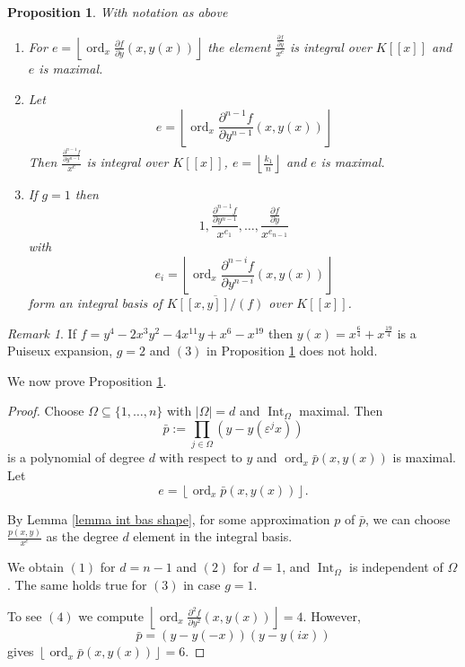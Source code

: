 \documentclass[a4paper,11pt]{amsart}%
\theoremstyle{definition}
\theoremstyle{plain}
\newtheorem{proposition}[defn]{Proposition}
\theoremstyle{remark}
\newtheorem{remark}[defn]{Remark}
\begin{document}
\begin{proposition}
\label{prop integral}
With notation as above
\begin{enumerate}
\item For $e=\left\lfloor \operatorname{ord}_{x}\frac{\partial f}{\partial
y}(x,y(x))\right\rfloor $ the element $\frac{\frac{\partial f}{\partial y}%
}{x^{e}}$ is integral over $K[[x]]$ and $e$ is maximal.

\item Let%
\[
e=\left\lfloor \operatorname{ord}_{x}\frac{\partial^{n-1}f}{\partial y^{n-1}%
}(x,y(x))\right\rfloor
\]
Then $\frac{\frac{\partial^{n-1}f}{\partial y^{n-1}}}{x^{e}}$ is integral over
$K[[x]]$, $e=\left\lfloor \frac{k_{1}}{n}\right\rfloor $ and $e$ is maximal.

\item If $g=1$ then
\[
1,\frac{\frac{\partial^{n-1}f}{\partial y^{n-1}}}{x^{e_{1}}},\ldots
,\frac{\frac{\partial f}{\partial y}}{x^{e_{n-1}}}%
\]
with
\[
e_{i}=\left\lfloor \operatorname{ord}_{x}\frac{\partial^{n-i}f}{\partial
y^{n-i}}(x,y(x))\right\rfloor
\]
form an integral basis of $\overline{K[[x,y]]/\left(  f\right)  }$ over
$K[[x]]$.
\end{enumerate}
\end{proposition}

\begin{remark}
If $f=y^{4}-2x^{3}y^{2}-4x^{11}y+x^{6}-x^{19}$ then $y(x)=x^{\frac{6}{4}%
}+x^{\frac{19}{4}}$ is a Puiseux expansion, $g=2$ and $(3)$ in Proposition
\ref{prop integral} does not hold.
\end{remark}

We now prove Proposition \ref{prop integral}.

\begin{proof}
Choose $\Omega\subseteq\{1,\ldots,n\}$ with $\left\vert \Omega\right\vert =d$
and $\operatorname*{Int}_{\Omega}$ maximal. Then%
\[
\bar{p}:=%
{\displaystyle\prod\limits_{j\in\Omega}}
\left(  y-y(\varepsilon^{j}x)\right)
\]
is a polynomial of degree $d$ with respect to $y$ and $\operatorname{ord}%
_{x}\bar{p}(x,y(x))$ is maximal. Let%
\[
e=\left\lfloor \operatorname{ord}_{x}\bar{p}(x,y(x))\right\rfloor \text{.}%
\]

By Lemma \ref{lemma int bas shape}, for some approximation $p$ of $\bar{p}$, we
can choose $\frac{p(x,y)}{x^{e}}$ as the degree $d$ element in the integral basis.

We obtain $(1)$ for $d=n-1$ and $(2)$ for $d=1$, and $\operatorname*{Int}%
_{\Omega}$ is independent of $\Omega$. The same holds true for $(3)$ in case
$g=1$.

To see $(4)$ we compute $\left\lfloor \operatorname{ord}_{x}\frac{\partial
^{2}f}{\partial y^{2}}(x,y(x))\right\rfloor =4$. However,
\[
\bar{p}=\left(  y-y(-x)\right)  \left(  y-y(ix)\right)
\]
gives $\left\lfloor \operatorname{ord}_{x}\bar{p}(x,y(x))\right\rfloor =6$.
\end{proof}
\end{document}
